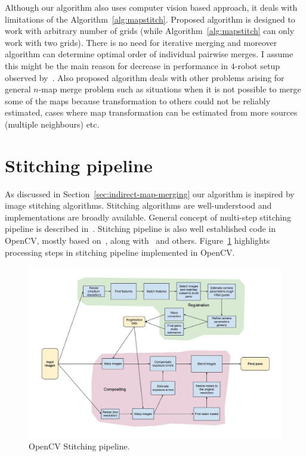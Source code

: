 Although our algorithm also uses computer vision based approach, it deals with limitations of the Algorithm~\ref{alg:mapstitch}. Proposed algorithm is designed to work with arbitrary number of grids (while Algorithm~\ref{alg:mapstitch} can only work with two grids). There is no need for iterative merging and moreover algorithm can determine optimal order of individual pairwise merges. I assume this might be the main reason for decrease in performance in $4$-robot setup observed by~\cite{Andre2014}. Also proposed algorithm deals with other problems arising for general $n$-map merge problem such as situations when it is not possible to merge some of the maps because transformation to others could not be reliably estimated, cases where map transformation can be estimated from more sources (multiple neighbours) etc.

\section{Stitching pipeline} %
\label{sec:stitchingpipeline}

As discussed in Section~\ref{sec:indirect-map-merging} our algorithm is inspired by image stitching algorithms. Stitching algorithms are well-understood and implementations are broadly available. General concept of multi-step stitching pipeline is described in~\cite{Brown2006}. Stitching pipeline is also well established code in \gls{OpenCV}, mostly based on~\cite{Brown2006}, along with~\cite{Szeliski2004} \cite{Shum1998} and others. Figure~\ref{fig:opencv} highlights processing steps in stitching pipeline implemented in \gls{OpenCV}.

\begin{figure}
	\centering
	\includegraphics[width=\textwidth]{../img/StitchingPipeline.jpg}
	\caption{\gls{OpenCV} Stitching pipeline.}
	\label{fig:opencv}
\end{figure}

